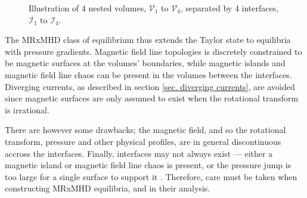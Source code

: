 \documentclass[my_thesis.tex]{subfiles}
\begin{document}
\begin{figure}
	\centering
	\caption{Illustration of 4 nested volumes, $\mathcal{V}_1$ to $\mathcal{V}_4$, separated by 4 interfaces, $\mathcal{I}_1$ to $\mathcal{I}_4$.}
	\label{fig:Illustration_SPEC}
\end{figure}

The MRxMHD class of equilibrium thus extends the Taylor state to equilibria with pressure gradients. Magnetic field line topologies is discretely constrained to be magnetic surfaces at the volumes' boundaries, while magnetic islands and magnetic field line chaos can be present in the volumes between the interfaces. Diverging currents, as described in section \ref{sec. diverging currents}, are avoided since magnetic surfaces are only assumed to exist when the rotational transform is irrational. 

There are however some drawbacks; the magnetic field, and so the rotational transform, pressure and other physical profiles, are in general discontinuous accross the interfaces. Finally, interfaces may not always exist --- either a magnetic island or magnetic field line chaos is present, or the pressure jump is too large for a single surface to support it \citep{Qu2021}. Therefore, care must be taken when constructing MRxMHD equilibria, and in their analysis. 
\end{document}
